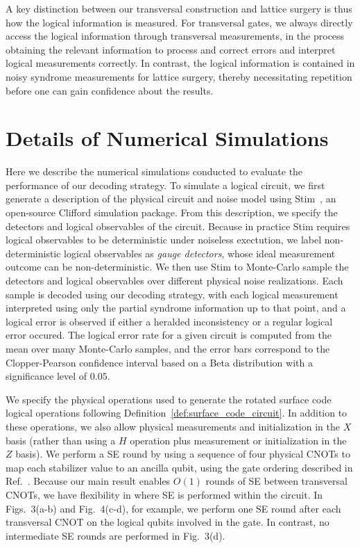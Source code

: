 A key distinction between our transversal construction and lattice surgery is thus how the logical information is measured.
%
For transversal gates, we always directly access the logical information through transversal measurements, in the process obtaining the relevant information to process and correct errors and interpret logical measurements correctly.
%
In contrast, the logical information is contained in noisy syndrome measurements for lattice surgery, thereby necessitating repetition before one can gain confidence about the results.

\section{Details of Numerical Simulations}
\label{si:numerics}

Here we describe the numerical simulations conducted to evaluate the performance of our decoding strategy. 
To simulate a logical circuit, we first generate a description of the physical circuit and noise model using Stim~\cite{gidney2021stim}, an open-source Clifford simulation package. 
From this description, we specify the detectors and logical observables of the circuit.
Because in practice Stim requires logical observables to be deterministic under noiseless exectution, we label non-deterministic logical observables as \textit{gauge detectors}, whose ideal measurement outcome can be non-deterministic. 
We then use Stim to Monte-Carlo sample the detectors and logical observables over different physical noise realizations.
Each sample is decoded using our decoding strategy, with each logical measurement interpreted using only the partial syndrome information up to that point, and a logical error is observed if either a heralded inconsistency or a regular logical error occured.
The logical error rate for a given circuit is computed from the mean over many Monte-Carlo samples, and the error bars correspond to the Clopper-Pearson confidence interval based on a Beta distribution with a significance level of $0.05$.


We specify the physical operations used to generate the rotated surface code logical operations following Definition~\ref{def:surface_code_circuit}.
In addition to these operations, we also allow physical measurements and initialization in the $X$ basis (rather than using a $H$ operation plus measurement or initialization in the $Z$ basis). 
We perform a SE round by using a sequence of four physical CNOTs to map each stabilizer value to an ancilla qubit, using the gate ordering described in Ref.~\cite{acharya2023suppressing}.
Because our main result enables $O(1)$ rounds of SE between transversal CNOTs, we have flexibility in where SE is performed within the circuit.
In Figs.~3(a-b) and Fig.~4(c-d), for example, we perform one SE round after each transversal CNOT on the logical qubits involved in the gate.
In contrast, no intermediate SE rounds are performed in Fig.~3(d).

